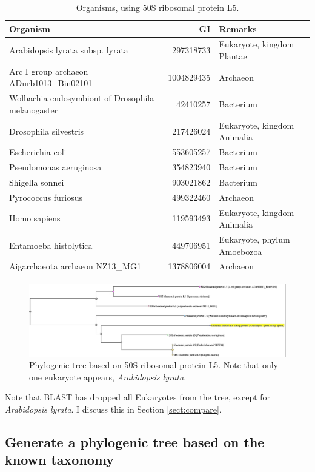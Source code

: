 \documentclass[]{article}
\begin{document}
\begin{table}[H]
	\caption{Organisms, using 50S ribosomal protein L5.}\label{tab:organisms}
	\centering
	\begin{tabular}{|l |r | p{5cm} |}
		\hline
		\textbf{Organism} & \textbf{GI} & \textbf{Remarks}\\ \hline
		Arabidopsis lyrata subsp. lyrata &297318733 & Eukaryote,  kingdom Plantae \\ \hline
		Arc I group archaeon ADurb1013\_Bin02101&1004829435&Archaeon\\ \hline
		Wolbachia endosymbiont of Drosophila melanogaster  &42410257 &Bacterium \\ \hline
		Drosophila silvestris&217426024&Eukaryote, kingdom Animalia\\\hline
		Escherichia coli &553605257 & Bacterium\\ \hline
		Pseudomonas aeruginosa &354823940 & Bacterium\\ \hline
		Shigella sonnei &903021862 &Bacterium \\ \hline
		Pyrococcus furiosus &499322460 &Archaeon \\ \hline
		Homo sapiens & 119593493&Eukaryote, kingdom Animalia  \\ \hline
		Entamoeba histolytica  &449706951&Eukaryote, phylum Amoebozoa\\ \hline
		Aigarchaeota archaeon NZ13\_MG1&1378806004&Archaeon\\ \hline
	\end{tabular}
\end{table}

\begin{figure}[H]
	\caption{Phylogenic tree based on 50S ribosomal protein L5.  Note that only one eukaryote appears, \textit{Arabidopsis lyrata}.}\label{fig:Phylo1}
	\includegraphics[width=\textwidth]{Phylo1}
\end{figure}

Note that BLAST has dropped all Eukaryotes  from the tree, except for  \textit{Arabidopsis lyrata}. I discuss this in Section \ref{sect:compare}.

\subsection{Generate a phylogenic tree based on the known taxonomy}
\end{document}

